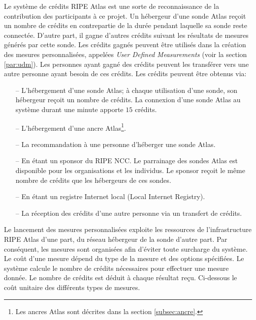 Le système de crédits RIPE Atlas est une sorte de reconnaissance de la contribution des participants à ce projet. Un hébergeur d'une sonde  Atlas reçoit un nombre de crédits en contrepartie de la durée pendant laquelle sa sonde reste connectée. D'autre part, il gagne d'autres crédits suivant les résultats de mesures générés par cette sonde. Les crédits gagnés peuvent être utilisés dans la création des mesures personnalisées, appelées  \textit{User Defined Measurements} (voir la section \ref{par:udm}). Les personnes ayant gagné des crédits peuvent les transférer vers une autre personne ayant besoin de ces crédits. Les crédits peuvent être obtenus via:
\begin{itemize}
	\item[--] L'hébergement d'une sonde Atlas; à chaque utilisation d'une sonde, son hébergeur reçoit un nombre de crédits.  La connexion d'une sonde  Atlas au système durant une minute apporte $15$ crédits.
	\item[--] L'hébergement d'une ancre  Atlas\footnote{Les ancres Atlas sont décrites dans  la section \ref{subsec:ancre}.}.
	\item[--] La recommandation à une personne d'héberger une sonde  Atlas.
	\item[--] En étant un sponsor du RIPE NCC. Le parrainage des sondes Atlas est disponible pour les organisations et les individus.  Le sponsor reçoit le même nombre de crédits que les hébergeurs de ces sondes.
	\item[--] En étant  un  registre Internet local (Local Internet Registry).
	\item[--] La réception des crédits d'une autre personne via un transfert de crédits.
\end{itemize}

Le lancement des mesures personnalisées exploite les ressources de l'infrastructure RIPE Atlas d'une part,  du réseau hébergeur de la sonde d'autre part. Par conséquent, les mesures sont organisées afin d'éviter toute surcharge du système. Le coût d'une  mesure dépend du type de la mesure et des options spécifiées. Le système calcule le nombre de crédits nécessaires pour effectuer une mesure donnée. Le nombre de crédits est déduit à chaque résultat reçu.  Ci-dessous le coût unitaire des différents types de mesures.


